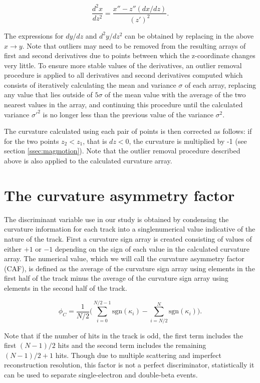 \documentclass{JINST}
\begin{document}
\begin{equation}
\frac{d^2x}{dz^2} = \frac{x'' - z''(dx/dz)}{(z')^2}.
\end{equation}

The expressions for $dy/dz$ and $d^2y/dz^2$ can be obtained by replacing in the above $x \rightarrow y$.  Note that outliers may need to be removed from the resulting arrays of first and second derivatives due to points between which the z-coordinate changes very little.  To ensure more stable values of the derivatives, an outlier removal procedure is applied to all derivatives and second derivatives computed which consists of iteratively calculating the mean and variance $\sigma$ of each array, replacing any value that lies outside of $5\sigma$ of the mean value with the average of the two nearest values in the array, and continuing this procedure until the calculated variance $\sigma'^2$ is no longer less than the previous value of the variance $\sigma^2$. %

The curvature calculated using each pair of points is then corrected as follows: if for the two points $z_2 < z_1$, that is 
$dz < 0$, the curvature is multiplied by -1 (see section \ref{ssec:magmotion}).  Note that the outlier removal procedure 
described above is also applied to the calculated curvature array.  

\section{The curvature asymmetry factor}
The discriminant variable use in our study is obtained by condensing the curvature information for each track into a singlenumerical value indicative of the nature of the track.  First a curvature sign array is created 
consisting of values of either $+1$ or $-1$ depending on the sign of each value in the calculated curvature array.  The 
numerical value, which we will
call the curvature asymmetry factor (CAF), is defined as the average of the curvature sign array using elements in the first half of 
the track minus the average of the curvature sign array using elements in the second half of the track.  

\begin{equation}\label{eqn_assym}
\phi_{C} = \frac{1}{N/2}\Biggl(\sum_{i=0}^{N/2-1}\mathrm{sgn}(\kappa_{i}) - \sum_{i=N/2}^{N}\mathrm{sgn}(\kappa_{i})\Biggr).
\end{equation}

\noindent Note that if the number of hits in the track is odd, the first term includes the first $(N-1)/2$ hits and
the second term includes the remaining $(N-1)/2 + 1$ hits.  Though due to multiple scattering and imperfect
reconstruction resolution, this factor is not a perfect discriminator, statistically it can be used to separate 
single-electron and double-beta events.  
\end{document}
